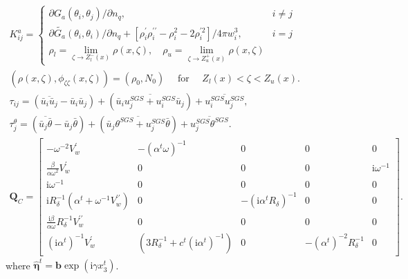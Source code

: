 \documentclass[12pt,a4paper]{article}
\begin{document}
\[
\begin{gathered}
K_{i j}^{a}= \begin{cases}\partial G_{a}\left(\theta_{i}, \theta_{j}\right) / \partial n_{q}, & i \neq j \\
\partial \widetilde{G_{a}}\left(\theta_{i}, \theta_{i}\right) / \partial n_{q}+\left[\rho_{i}^{\prime} \rho_{i}^{\prime \prime}-\rho_{i}^{2}-2 \rho_{i}^{\prime 2}\right] / 4 \pi w_{i}^{3}, & i=j \\
\rho_{l}=\lim _{\zeta \rightarrow Z_{l}^{-}(x)} \rho(x, \zeta), \quad \rho_{u}=\lim _{\zeta \rightarrow Z_{u}^{+}(x)} \rho(x, \zeta)\end{cases} \\
\left(\rho(x, \zeta), \phi_{\zeta \zeta}(x, \zeta)\right)=\left(\rho_{0}, N_{0}\right) \quad \text { for } \quad Z_{l}(x)<\zeta<Z_{u}(x) . \\
\tau_{i j}=\left(\overline{\bar{u}_{i} \bar{u}_{j}}-\bar{u}_{i} \bar{u}_{j}\right)+\left(\overline{\bar{u}_{i} u_{j}^{S G S}+u_{i}^{S G S} \bar{u}_{j}}\right)+\overline{u_{i}^{S G S} u_{j}^{S G S}}, \\
\tau_{j}^{\theta}=\left(\overline{\bar{u}_{j} \bar{\theta}}-\bar{u}_{j} \bar{\theta}\right)+\left(\overline{\bar{u}_{j} \theta^{S G S}+u_{j}^{S G S} \bar{\theta}}\right)+\overline{u_{j}^{S G S} \theta^{S G S}} . \\
\boldsymbol{Q}_{C}=\left[\begin{array}{ccccc}
-\omega^{-2} V_{w}^{\prime} & -\left(\alpha^{t} \omega\right)^{-1} & 0 & 0 & 0 \\
\frac{\beta}{\alpha \omega^{2}} V_{w}^{\prime} & 0 & 0 & 0 & \mathrm{i} \omega^{-1} \\
\mathrm{i} \omega^{-1} & 0 & 0 & 0 & 0 \\
\mathrm{i} R_{\delta}^{-1}\left(\alpha^{t}+\omega^{-1} V_{w}^{\prime \prime}\right) & 0 & -\left(\mathrm{i} \alpha^{t} R_{\delta}\right)^{-1} & 0 & 0 \\
\frac{\mathrm{i} \beta}{\alpha \omega} R_{\delta}^{-1} V_{w}^{\prime \prime} & 0 & 0 & 0 & 0 \\
\left(\mathrm{i} \alpha^{t}\right)^{-1} V_{w}^{\prime} & \left(3 R_{\delta}^{-1}+c^{t}\left(\mathrm{i} \alpha^{t}\right)^{-1}\right) & 0 & -\left(\alpha^{t}\right)^{-2} R_{\delta}^{-1} & 0
\end{array}\right] .
\end{gathered}
\]
where \(\hat{\boldsymbol{\eta}}^{t}=\boldsymbol{b} \exp \left(\mathrm{i} \gamma x_{3}^{t}\right)\).
\end{document}
